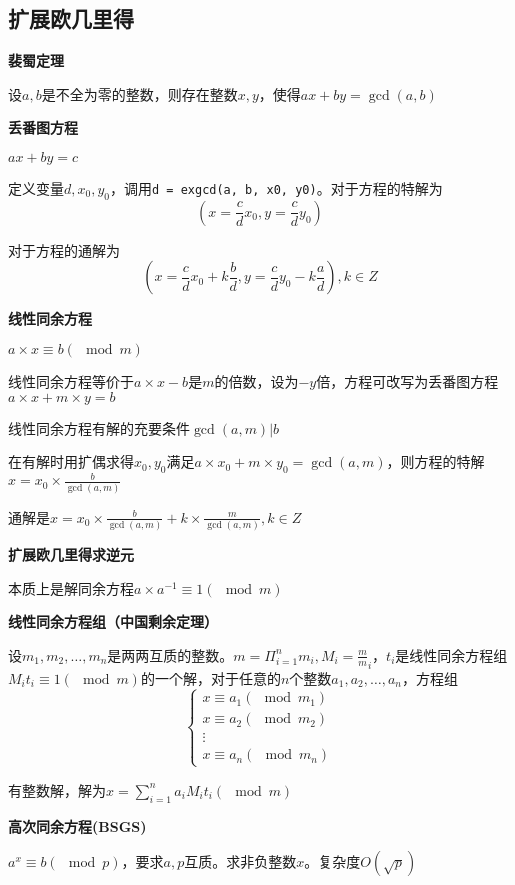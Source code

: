 \subsection{扩展欧几里得}
\textbf{裴蜀定理}

设$a,b$是不全为零的整数，则存在整数$x,y$，使得$ax+by=\gcd(a,b)$


\textbf{丢番图方程}

$ax+by=c$

定义变量$d,x_0,y_0$，调用\verb|d = exgcd(a, b, x0, y0)|。对于方程的特解为
\[
(x=\frac c d x_0 , y = \frac c d y_0)
\]

对于方程的通解为
\[
(x = \frac c d x_0 + k \frac b d , y = \frac c d y_0 - k \frac a d ) ,k \in Z
\]

\textbf{线性同余方程}

$a\times x\equiv b(\mod m)$

线性同余方程等价于$a\times x - b$是$m$的倍数，设为$-y$倍，方程可改写为丢番图方程$a \times x + m\times y=b$

线性同余方程有解的充要条件$\gcd(a,m)|b$

在有解时用扩偶求得$x_0,y_0$满足$a\times x_0+m\times y_0=\gcd(a,m)$，则方程的特解$x=x_0\times \frac b{\gcd(a,m)}$

通解是$x=x_0\times \frac b{\gcd(a,m)} + k\times \frac{m}{\gcd(a,m)},k\in Z$



\textbf{扩展欧几里得求逆元}

本质上是解同余方程$a\times a^{-1} \equiv 1 (\mod m)$



\textbf{线性同余方程组（中国剩余定理）}

设$m_1,m_2,\dots,m_n$是两两互质的整数。$m=\Pi_{i=1}^nm_i,M_i=\frac m m_i$，$t_i$是线性同余方程组$M_it_i\equiv 1(\mod m)$的一个解，对于任意的$n$个整数$a_1,a_2,\dots,a_n$，方程组
\[
\left\{\begin{matrix}
           x\equiv a_1(\mod m_1)\\
           x\equiv a_2(\mod m_2)\\
           \vdots \\
           x\equiv a_n(\mod m_n)
\end{matrix}\right.
\]


有整数解，解为$x=\sum_{i=1}^na_iM_it_i(\mod m)$



\textbf{高次同余方程(BSGS)}

$a^x\equiv b (\mod p)$，要求$a,p$互质。求非负整数$x$。复杂度$O(\sqrt p)$
